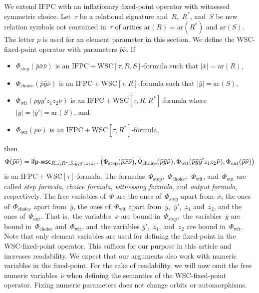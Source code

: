 \documentclass[]{lmcs}
\newcommand{\defining}[1]{\emph{#1}}
\newcommand{\qspace}{\mathchoice{\;}{\,}{}{}}
\newcommand{\numVarA}{\nu}
\newcommand{\formA}{\Phi}
\newcommand{\tup}[1]{\bar{#1}}
\newcommand{\arity}[1]{\mathrm{ar}(#1)}
\newcommand{\sig}{\tau}
\newcommand{\IFPC}{\ensuremath{\mathrm{IFPC}}}
\newcommand{\ifpcwscsig}[1]{\ensuremath{\mathrm{IFPC{+}WSC}[#1]}}
\newcommand{\formOut}{\formA_{\text{out}}}
\newcommand{\formStep}{\formA_{\text{step}}}
\newcommand{\formChoice}{\formA_{\text{choice}}}
\newcommand{\formWit}{\formA_{\text{wit}}}
\newcommand{\ifpwscSym}{\mathsf{ifp}\text{-}\mathsf{wsc}}
\newcommand{\ifpwscbig}[8]{\ifpwscSym_{#1; #2; #3; #4}.\qspace\big(#5,#6,#7, #8\big)}
\begin{document}
We extend \IFPC{} with an inflationary fixed-point operator with witnessed symmetric choice.
Let~$\sig$ be a relational signature
and~$R$,~$R^*$, and~$S$ be new relation symbols not contained in~$\sig$
of arities $\arity{R}=\arity{R^*}$ and $\arity{S}$.
The letter $p$ is used for an element parameter in this section.
We define the WSC-fixed-point operator with parameters $\tup{p}\tup{\numVarA}$.
If
\begin{itemize}
	\item 
	$\formStep(\tup{p}\tup{x}\tup{\numVarA})$
	is an \ifpcwscsig{\sig, R, S}-formula such that $|\tup{x}| = \arity{R}$, 
	\item
	$\formChoice(\tup{p}\tup{y}\tup{\numVarA})$ is an \ifpcwscsig{\sig, R}-formula
	such that $|\tup{y}| = \arity{S}$,
	\item
	$\formWit(\tup{p}\tup{y}\tup{y}'z_1z_2\tup{\numVarA})$ is an \ifpcwscsig{\sig  , R, R^*}-formula where $|\tup{y}|=|\tup{y}'|=\arity{S}$, and
	\item
	$\formOut(\tup{p}\tup{\numVarA})$ is an \ifpcwscsig{\sig, R^*}-formula,
\end{itemize}
then
\[\formA(\tup{p}\tup{\numVarA}) = \ifpwscbig{R,\tup{x}}{R^*}{S,\tup{y}, \tup{y}'}{z_1z_2}{\formStep(\tup{p}\tup{x}\tup{\numVarA})}{\formChoice(\tup{p}\tup{y}\tup{\numVarA})}{\formWit(\tup{p}\tup{y}\tup{y}'z_1z_2\tup{\numVarA})}{\formOut(\tup{p}\tup{\numVarA})}\]
is an \ifpcwscsig{\sig}-formula.
The formulas~$\formStep$,~$\formChoice$,~$\formWit$, and~$\formOut$ are
called \defining{step formula}, \defining{choice formula}, \defining{witnessing formula}, and \defining{output formula}, respectively.
The free variables of~$\formA$ are 
the ones of~$\formStep$ apart from~$\tup{x}$,
the ones of~$\formChoice$ apart from~$\tup{y}$,
the ones of~$\formWit$ apart from~$\tup{y}$,~$\tup{y}'$,~$z_1$ and~$z_2$, and
the ones of~$\formOut$.
That is,~the variables~$\tup{x}$ are bound in~$\formStep$,~the variables~$\tup{y}$ are bound in~$\formChoice$ and~$\formWit$,
and~the variables $\tup{y}'$,~$z_1$, and~$z_2$ are bound in~$\formWit$.
Note that only element variables are used for defining the fixed-point
in the WSC-fixed-point operator.
This suffices for our purpose in this article and 
increases readability.
We expect that our arguments also work with numeric variables in the fixed-point.
For the sake of readability, we will now omit the free numeric variables~$\tup{\numVarA}$
when defining the semantics of the WSC-fixed-point operator.
Fixing numeric parameters does not change orbits or automorphisms.
\end{document}
